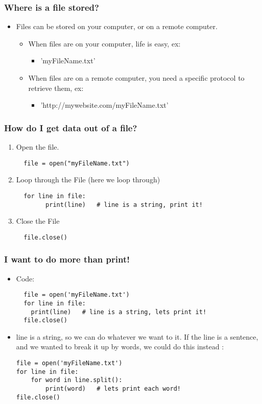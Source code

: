 \documentclass{beamer}
\begin{document}
\begin{frame}[fragile]
\frametitle{Where is a file stored?}
\begin{itemize}
\item Files can be stored on your computer, or on a remote computer.
\begin{itemize}
\item When files are on your computer, life is easy, ex:
\begin{itemize}
\item  'myFileName.txt'
\end{itemize}
\item When files are on a remote computer, you need a specific protocol to retrieve them, ex:
\begin{itemize}
\item 'http://mywebsite.com/myFileName.txt'
\end{itemize}
\end{itemize} 
\end{itemize}
\end{frame}

\begin{frame}[fragile]
\frametitle{How do I get data out of a file?}
\begin{enumerate}
\item Open the file.
  \begin{lstlisting}
  file = open("myFileName.txt")
  \end{lstlisting}
\item Loop through the File (here we loop through)
  \begin{lstlisting}
  for line in file:
        print(line)   # line is a string, print it!
  \end{lstlisting}
\item Close the File
  \begin{lstlisting}
  file.close()
  \end{lstlisting}
\end{enumerate}
\end{frame}

\begin{frame}[fragile]
\frametitle{I want to do more than print!}
\begin{itemize}
\item Code:
  \begin{lstlisting}
  file = open('myFileName.txt')
  for line in file:
    print(line)   # line is a string, lets print it!
  file.close()  
  \end{lstlisting}
\item line is a string, so we can do whatever we want to it.  If the line is a sentence, and we wanted to break it up by words, we could do this instead :
  \begin{lstlisting}
file = open('myFileName.txt')
for line in file:
    for word in line.split():
        print(word)   # lets print each word!
file.close()
  \end{lstlisting}
\end{itemize}
\end{frame}
\end{document}
